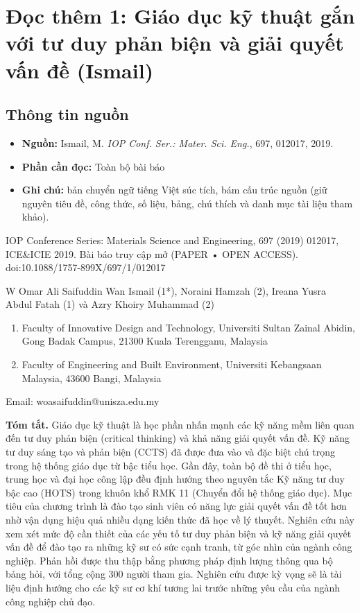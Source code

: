 \chapter{Đọc thêm 1: Giáo dục kỹ thuật gắn với tư duy phản biện và giải quyết vấn đề (Ismail)}
\label{ch:M5L4DocThem1}

\section{Thông tin nguồn}

\begin{itemize}
  \item \textbf{Nguồn:} Ismail, M. \emph{IOP Conf. Ser.: Mater. Sci. Eng.}, 697, 012017, 2019.
  \item \textbf{Phần cần đọc:} Toàn bộ bài báo
  \item \textbf{Ghi chú:} bản chuyển ngữ tiếng Việt súc tích, bám cấu trúc nguồn (giữ nguyên tiêu đề, công thức, số liệu, bảng, chú thích và danh mục tài liệu tham khảo).
\end{itemize}

IOP Conference Series: Materials Science and Engineering, 697 (2019) 012017, ICE\&ICIE 2019. Bài báo truy cập mở (PAPER • OPEN ACCESS). doi:10.1088/1757-899X/697/1/012017

W Omar Ali Saifuddin Wan Ismail (1*), Noraini Hamzah (2), Ireana Yusra Abdul Fatah (1) và Azry Khoiry Muhammad (2)

\begin{enumerate}
\def\labelenumi{\arabic{enumi}.}
\item
  Faculty of Innovative Design and Technology, Universiti Sultan Zainal Abidin, Gong Badak Campus, 21300 Kuala Terengganu, Malaysia
\item
  Faculty of Engineering and Built Environment, Universiti Kebangsaan Malaysia, 43600 Bangi, Malaysia
\end{enumerate}

Email: woasaifuddin@unisza.edu.my

\textbf{Tóm tắt.} Giáo dục kỹ thuật là học phần nhấn mạnh các kỹ năng mềm liên quan đến tư duy phản biện (critical thinking) và khả năng giải quyết vấn đề. Kỹ năng tư duy sáng tạo và phản biện (CCTS) đã được đưa vào và đặc biệt chú trọng trong hệ thống giáo dục từ bậc tiểu học. Gần đây, toàn bộ đề thi ở tiểu học, trung học và đại học công lập đều định hướng theo nguyên tắc Kỹ năng tư duy bậc cao (HOTS) trong khuôn khổ RMK 11 (Chuyển đổi hệ thống giáo dục). Mục tiêu của chương trình là đào tạo sinh viên có năng lực giải quyết vấn đề tốt hơn nhờ vận dụng hiệu quả nhiều dạng kiến thức đã học về lý thuyết. Nghiên cứu này xem xét mức độ cần thiết của các yếu tố tư duy phản biện và kỹ năng giải quyết vấn đề để đào tạo ra những kỹ sư có sức cạnh tranh, từ góc nhìn của ngành công nghiệp. Phản hồi được thu thập bằng phương pháp định lượng thông qua bộ bảng hỏi, với tổng cộng 300 người tham gia. Nghiên cứu được kỳ vọng sẽ là tài liệu định hướng cho các kỹ sư cơ khí tương lai trước những yêu cầu của ngành công nghiệp chủ đạo.

